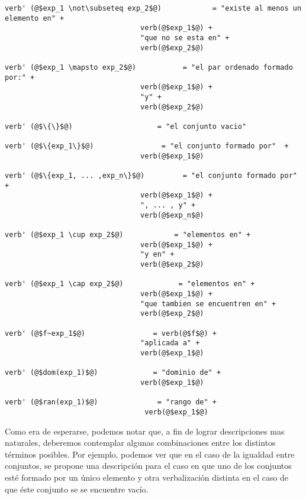 \begin{verbatim}
verb' (@$exp_1 \not\subseteq exp_2$@)            = "existe al menos un elemento en" +  
                                verb(@$exp_1$@) +  
                                "que no se esta en" +  
                                verb(@$exp_2$@) 

verb' (@$exp_1 \mapsto exp_2$@)           = "el par ordenado formado por:" +  
                                verb(@$exp_1$@) +  
                                "y" +  
                                verb(@$exp_2$@) 

verb' (@$\{\}$@)                    = "el conjunto vacio" 

verb' (@$\{exp_1\}$@)                = "el conjunto formado por"  +  
                                verb(@$exp_1$@) 

verb' (@$\{exp_1, ... ,exp_n\}$@)         = "el conjunto formado por" +  
                                verb(@$exp_1$@) +  
                                ", ... , y" +  
                                verb(@$exp_n$@) 

verb' (@$exp_1 \cup exp_2$@)            = "elementos en" +  
                                verb(@$exp_1$@) +  
                                "y en" +  
                                verb(@$exp_2$@) 

verb' (@$exp_1 \cap exp_2$@)             = "elementos en" +  
                                verb(@$exp_1$@) +  
                                "que tambien se encuentren en" +  
                                verb(@$exp_2$@) 

verb' (@$f~exp_1$@)                = verb(@$f$@) +  
                                "aplicada a" +  
                                verb(@$exp_1$@) 

verb' (@$dom(exp_1)$@)             = "dominio de" +  
                                verb(@$exp_1$@) 

verb' (@$ran(exp_1)$@)              = "rango de" +  
                                 verb(@$exp_1$@)  
\end{verbatim}

\bigskip
Como era de esperarse, podemos notar que, a fin de lograr descripciones mas naturales, deberemos contemplar algunas combinaciones entre los distintos términos posibles. Por ejemplo, podemos ver que en el caso de la igualdad entre conjuntos, se propone una descripción para el caso en que uno de los conjuntos esté formado por un único elemento y otra verbalización distinta en el caso de que éste conjunto se se encuentre vacío.

